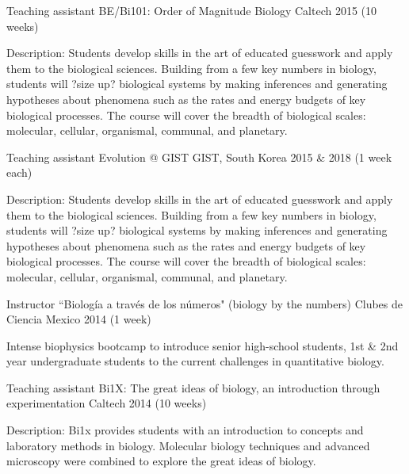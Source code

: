 \begin{cventries}
  \cventry
    {Teaching assistant} %
    {BE/Bi101: Order of Magnitude Biology} %
    {Caltech} %
    {2015 (10 weeks)} %
    {
      \begin{cvitems} %
        \item {Description: Students develop skills in the art of educated
        guesswork and apply them to the biological sciences. Building from a
        few key numbers in biology, students will ?size up? biological systems
        by making inferences and generating hypotheses about phenomena such as
        the rates and energy budgets of key biological processes. The course
        will cover the breadth of biological scales: molecular, cellular,
        organismal, communal, and planetary.}
      \end{cvitems}
    }

  \cventry
    {Teaching assistant} %
    {Evolution @ GIST} %
    {GIST, South Korea} %
    {2015 \& 2018 (1 week each)} %
    {
      \begin{cvitems} %
        \item {Description: Students develop skills in the art of educated
        guesswork and apply them to the biological sciences. Building from a
        few key numbers in biology, students will ?size up? biological systems
        by making inferences and generating hypotheses about phenomena such as
        the rates and energy budgets of key biological processes. The course
        will cover the breadth of biological scales: molecular, cellular,
        organismal, communal, and planetary.}
      \end{cvitems}
    }

  \cventry
    {Instructor} %
    {``Biolog\'{i}a a trav\'{e}s de los n\'{u}meros" (biology by the numbers)} 
    {Clubes de Ciencia Mexico} %
    {2014 (1 week)} %
    {
      \begin{cvitems} %
        \item {Intense biophysics bootcamp to introduce senior high-school
        students, 1st \& 2nd year undergraduate students to the current
        challenges in quantitative biology.}
      \end{cvitems}
    }

  \cventry
    {Teaching assistant} %
    {Bi1X: The great ideas of biology, an introduction through experimentation}
    {Caltech} %
    {2014 (10 weeks)} %
    {
      \begin{cvitems} %
        \item {Description: Bi1x provides students with an introduction to
        concepts and laboratory methods in biology. Molecular biology
        techniques and advanced microscopy were combined to explore the great
        ideas of biology.}
      \end{cvitems}
    }

\end{cventries}
